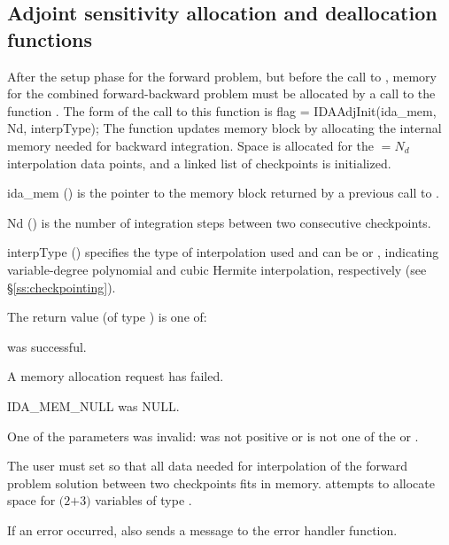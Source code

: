 \subsection{Adjoint sensitivity allocation and deallocation functions}
\label{sss:idaadjinit}

After the setup phase for the forward problem, but before the call
to , memory for the combined forward-backward problem must be
allocated by a call to the function .
The form of the call to this function is
{
  flag = IDAAdjInit(ida\_mem, Nd, interpType);
}
{
  The function  updates {\idas} memory block by allocating
  the internal memory needed for backward integration.
  Space is allocated for the  $= N_d$ interpolation data points, and
  a linked list of checkpoints is initialized.
}
{
  \begin{args}[interpType]
  \item[ida\_mem] ()
    is the pointer to the {\idas} memory block returned by a previous call
    to .
  \item[Nd] ()
    is the number of integration steps between two consecutive checkpoints.
  \item[interpType] ()
    specifies the type of interpolation used and can be 
    or , indicating variable-degree polynomial and cubic Hermite
    interpolation, respectively (see \S\ref{ss:checkpointing}).
  \end{args}
}
{
   The return value  (of type ) is one of:
   \begin{args}
   \item[\Id{IDA\_SUCCESS}]
      was successful.
   \item[\Id{IDA\_MEM\_FAIL}]
     A memory allocation request has failed.
   \item[IDA\_MEM\_NULL]
      was NULL.
   \item[\Id{IDA\_ILL\_INPUT}]
     One of the parameters was invalid:  was not positive or 
     is not one of the  or .
   \end{args}
}
{
  The user must set  so that all data needed for interpolation of the
  forward problem solution between two checkpoints fits in memory. 
  attempts to allocate space for $(2$$+3)$ variables of type .

  If an error occurred,  also sends a message to the
  error handler function.
}
